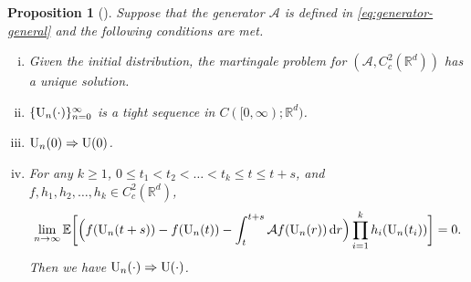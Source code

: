 \documentclass[11pt]{article}
\theoremstyle{plain}
\newtheorem{prop}{Proposition}[section]
\theoremstyle{definition}
\newcommand{\inner}[2]{\langle #1, #2 \rangle}
\def\d{\mathrm{d}}
\def\AM{{\mathcal A}}
\def\RB{{\mathbb R}}
\def\EB{{\mathbb E}}
\def\tr{\mathrm{tr}}
\newcommand{\uu}{{\textnormal{U}}}
\def\weakconverge{\Rightarrow}
\begin{document}
\begin{prop}[{\citealp[Chapter~4, Theorem~8.10]{ethier2009markov}}]\label{prop:mart-prob-approx}
	Suppose that the generator $\AM$ is defined in \eqref{eq:generator-general} and the following conditions are met. 
	\begin{enumerate}[(i)]
		\item \label{prop:final:condition:unique} Given the initial distribution, the martingale problem for $(\AM, C_c^2(\RB^d))$ has a unique solution.
		\item \label{prop:final:condition:tight} $\{ \uu_{n}(\cdot) \}_{n=0}^\infty$ is a tight sequence in $C([0, \infty); \RB^d)$.
		\item \label{prop:final:condition:initial}  $\uu_{n}(0) \weakconverge \uu(0)$.
		\item \label{prop:final:condition:mart-prob} For any $k \ge 1$, $0 \le t_1 < t_2 < \dots < t_k \le t \le t+s $, and $f, h_1, h_2, \dots, h_k \in C_c^2(\RB^d)$,
		\begin{equation}\label{eq:generator-condition}
			\lim_{n \to \infty} \EB  \bigg[ \Big( f(\uu_{n}(t+s)) - f(\uu_{n}(t)) - \int_t^{t+s} \AM f(\uu_{n}(r)) \,\d r \Big) \prod_{i=1}^k h_i(\uu_{n}(t_i)) \bigg]  = 0.
		\end{equation}
	Then we have $\uu_{n}(\cdot) \weakconverge \uu(\cdot)$.
	\end{enumerate}
\end{prop}

\begin{figure}[omitted: a diagram of this paper's results, not reproduced here]\label{fig:proof-intergrate}\end{figure}
\end{document}
